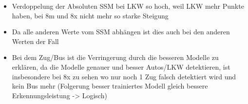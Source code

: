 {\begin{itemize}
\begin{itemize}
			\item Verdoppelung der Absoluten SSM bei LKW so hoch, weil LKW mehr Punkte haben, bei 8m und 8x nicht mehr so starke Steigung
			\item Da alle anderen Werte vom SSM abhängen ist dies auch bei den anderen Werten der Fall
			\item Bei dem Zug/Bus ist die Verringerung durch die besseren Modelle zu erklären, da die Modelle genauer und besser Autos/LKW detektieren, ist insbesondere bei 8x zu sehen wo nur noch 1 Zug falsch detektiert wird und kein Bus mehr (Folgerung besser trainiertes Modell gleich bessere Erkennungsleistung -> Logisch)
		\end{itemize}
	\end{itemize}



}
		



